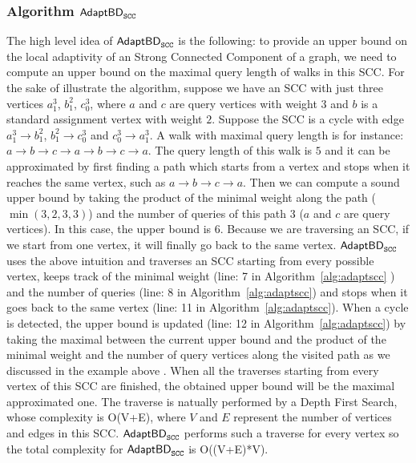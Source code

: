\subsubsection{Algorithm $\mathsf{AdaptBD}_{\mathtt{SCC}}$}
The high level idea of $\mathsf{AdaptBD}_{\mathtt{SCC}}$ is the following:
to provide an upper bound on the local adaptivity of an Strong Connected Component of a graph, 
we need to compute an upper bound on the maximal query length of walks in this SCC. 
For the sake of illustrate the algorithm, suppose we have an SCC with just three vertices $a^{3}_{1}$, $b^{2}_{1}$,
$c^{3}_{0}$, where $a$ and $c$ are query vertices with weight $3$ and $b$ is a standard assignment vertex with weight $2$. Suppose the SCC is a cycle with edge $a^{3}_{1} \to b^{2}_{1}$, $b^{2}_{1} \to c^{3}_{0}$ and $c^{3}_{0}\to a^{3}_{1}$. 
%
A walk with maximal query length is for instance: $a \to b \to c \to a \to b \to c \to a$. The query length of this walk is $5$ and it can be approximated by
 first finding a path which starts from a vertex and stops when it reaches the same vertex, such as $a \to b \to c \to a$. Then we can compute a sound upper bound by taking the product of 
 the minimal weight along the path ($\min(3,2,3,3)$) and the number of queries of this path $3$ ($a$ and $c$ are query vertices). In this case, the upper bound is $6$.
Because we are
 traversing an SCC, if we start from one vertex, it will finally go back to the same vertex.   
 $\mathsf{AdaptBD}_{\mathtt{SCC}}$ uses the above intuition and traverses an SCC starting from every possible
 vertex, keeps track of the minimal weight (line: 7 in Algorithm~\ref{alg:adaptscc} ) and the number of queries (line: 8 in Algorithm~\ref{alg:adaptscc}) and 
 stops when it goes back to the same vertex (line: 11 in Algorithm~\ref{alg:adaptscc}). When a cycle is detected,
 the upper bound is updated (line: 12 in Algorithm~\ref{alg:adaptscc}) by taking the maximal between the current upper bound and the product of the minimal weight
 and the number of query vertices along the visited path as we discussed in the example above . When all the traverses starting from 
 every vertex of this SCC are finished, the obtained upper bound will be the maximal approximated one. 
 The traverse is natually performed by a Depth First Search, whose complexity is O(V+E), where $V$ and $E$ 
 represent the number of vertices and edges in this SCC.  $\mathsf{AdaptBD}_{\mathtt{SCC}}$ performs such 
 a traverse for every vertex so the total complexity for $\mathsf{AdaptBD}_{\mathtt{SCC}}$ is O((V+E)*V).
 


